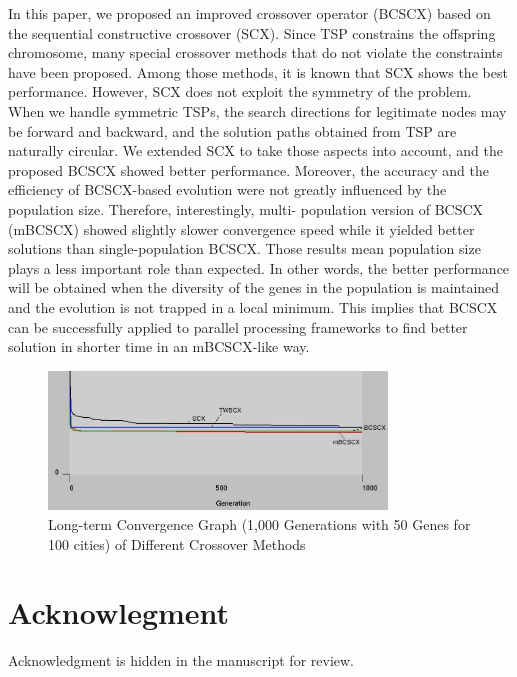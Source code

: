 In this paper, we proposed an improved crossover operator (BCSCX) based on the sequential constructive crossover (SCX). Since TSP constrains the offspring chromosome, many special crossover methods that do not violate the constraints have been proposed. Among those methods, it is known that SCX shows the best performance.
However, SCX does not exploit the symmetry of the problem. When we handle symmetric TSPs, the search directions for legitimate nodes may be forward and backward, and the solution paths obtained from TSP are naturally circular. We extended SCX to take those aspects into account, and the proposed BCSCX showed better performance.
Moreover, the accuracy and the efficiency of BCSCX-based evolution were not greatly influenced by the population size. Therefore, interestingly, multi- population version of BCSCX (mBCSCX) showed slightly slower convergence speed while it yielded better solutions than single-population BCSCX.
Those results mean population size plays a less important role than expected. In other words, the better performance will be obtained when the diversity of the genes in the population is maintained and the evolution is not trapped in a local minimum. This implies that BCSCX can be successfully applied to parallel processing frameworks to find better solution in shorter time in an mBCSCX-like way.

\begin{figure}
\centering
\label{fig:longTermEvolution}
\includegraphics[width=9.0cm]{images/longtermEvolve.jpg} 
\caption{Long-term Convergence Graph (1,000 Generations with 50 Genes for 100 cities) of Different Crossover Methods}
\end{figure}


\section*{Acknowlegment}

Acknowledgment is hidden in the manuscript for review.

